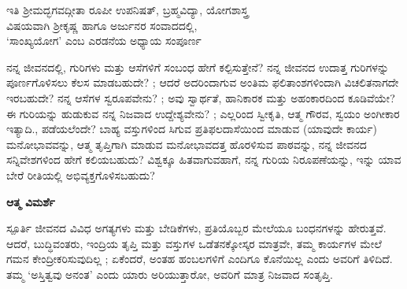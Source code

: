 \begin{center}
{\color{brown}
ಇತಿ ಶ್ರೀಮದ್ಭಗವದ್ಗೀತಾ  ರೂಪೀ ಉಪನಿಷತ್, ಬ್ರಹ್ಮವಿದ್ಯಾ, ಯೋಗಶಾಸ್ತ್ರ\\ ವಿಷಯವಾಗಿ ಶ್ರೀಕೃಷ್ಣ ಹಾಗೂ ಅರ್ಜುನರ ಸಂವಾದದಲ್ಲಿ, \\‘ಸಾಂಖ್ಯಯೋಗ’ ಎಂಬ ಎರಡನೆಯ ಅಧ್ಯಾಯ  ಸಂಪೂರ್ಣ}
\end{center}

\newpage
\begin{mananam}{}
\footnotesize \mananamtext ನನ್ನ ಜೀವನದಲ್ಲಿ, ಗುರಿಗಳು ಮತ್ತು ಆಸೆಗಳಿಗೆ ಸಂಬಂಧ ಹೇಗೆ ಕಲ್ಪಿಸುತ್ತೇನೆ? ನನ್ನ ಜೀವನದ ಉದಾತ್ತ   ಗುರಿಗಳನ್ನು ಪೂರ್ಣಗೊಳಿಸಲು ಕೆಲಸ ಮಾಡಬಹುದೇ? ; ಆದರೆ ಅದರಿಂದಾಗುವ ಅಂತಿಮ ಫಲಿತಾಂಶಗಳಿಂದಾಗಿ ವಿಚಲಿತನಾಗದೇ ಇರಬಹುದೇ? ನನ್ನ ಆಸೆಗಳ ಸ್ವರೂಪವೇನು? ; ಅವು ಸ್ವಾರ್ಥತೆ, ಹಾನಿಕಾರಕ ಮತ್ತು ಅಹಂಕಾರದಿಂದ ಕೂಡಿವೆಯೇ? ಈ ಗುರಿಯನ್ನು ಹುಡುಕುವ ನನ್ನ ನಿಜವಾದ ಉದ್ದೇಶ್ಯವೇನು? ; ಎಲ್ಲರಿಂದ ಸ್ವೀಕೃತಿ, ಆತ್ಮ ಗೌರವ, ಸ್ವಯಂ  ಅಂಗೀಕಾರ ಇತ್ಯಾದಿ., ಪಡೆಯಲೆಂದೇ?  ಬಾಹ್ಯ ವಸ್ತುಗಳಿಂದ ಸಿಗುವ ಪ್ರತಿಫಲದಾಸೆಯಿಂದ ಮಾಡುವ (ಯಾವುದೇ ಕಾರ್ಯ) ಮನೋಭಾವವನ್ನು, ಆತ್ಮ ತೃಪ್ತಿಗಾಗಿ ಮಾಡುವ ಮನೋಭಾವದತ್ತ ಹೊರಳಿಸುವ ಪಾಠವನ್ನು, ನನ್ನ ಜೀವನದ ಸನ್ನಿವೇಶಗಳಿಂದ ಹೇಗೆ ಕಲಿಯಬಹುದು? ವಿಶ್ವಕ್ಕೂ ಹಿತವಾಗುವಹಾಗೆ, ನನ್ನ ಗುರಿಯ ನಿರೂಪಣೆಯನ್ನು, ಇನ್ನು ಯಾವ ಬೇರೆ ರೀತಿಯಲ್ಲಿ  ಅಭಿವ್ಯಕ್ತಗೊಳಿಸಬಹುದು? 
\end{mananam}
\WritingHand\enspace\textbf{ಆತ್ಮ ವಿಮರ್ಶೆ}
\begin{inspiration}{\mananamfont ಸ್ಪೂರ್ತಿ}
\footnotesize \mananamtext ಜೀವನದ ವಿವಿಧ ಅಗತ್ಯಗಳು ಮತ್ತು ಬೇಡಿಕೆಗಳು, ಪ್ರತಿಯೊಬ್ಬರ ಮೇಲೆಯೂ ಬಂಧನಗಳನ್ನು ಹೇರುತ್ತವೆ. ಆದರೆ, ಬುದ್ಧಿವಂತರು, ಇಂದ್ರಿಯ ತೃಪ್ತಿ ಮತ್ತು ವಸ್ತುಗಳ ಒಡೆತನಕ್ಕೋಸ್ಕರ  ಮಾತ್ರವೇ, ತಮ್ಮ ಕಾರ್ಯಗಳ ಮೇಲೆ ಗಮನ ಕೇಂದ್ರೀಕರಿಸುವುದಿಲ್ಲ ; ಏಕೆಂದರೆ,  ಅಂತಹ ಹಂಬಲಗಳಿಗೆ ಎಂದಿಗೂ ಕೊನೆಯಿಲ್ಲ ಎಂದು ಅವರಿಗೆ ತಿಳಿದಿದೆ.
 ತಮ್ಮ ‘ಅಸ್ತಿತ್ವವು ಅನಂತ’ ಎಂದು ಯಾರು ಅರಿಯುತ್ತಾರೋ, ಅವರಿಗೆ ಮಾತ್ರ ನಿಜವಾದ ಸಂತೃಪ್ತಿ.
\end{inspiration}


